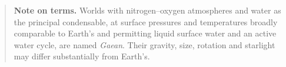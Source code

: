 \begin{quote}\small
\noindent\textbf{Note on terms.} Worlds with nitrogen--oxygen atmospheres and water as the principal condensable,
at surface pressures and temperatures broadly comparable to Earth's and permitting liquid surface water and an
active water cycle, are named \emph{Gaean}. Their gravity, size, rotation and starlight may differ substantially
from Earth's.
\end{quote}

